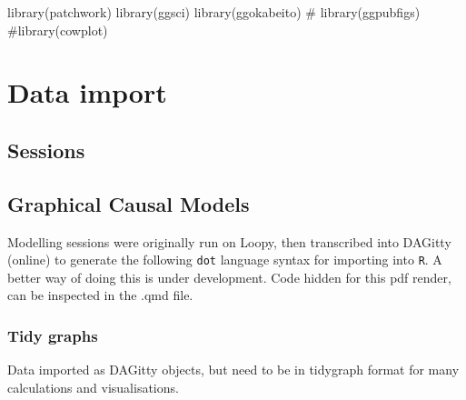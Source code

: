\documentclass[
  letterpaper,
  DIV=11,
  numbers=noendperiod]{scrartcl}
\newenvironment{Shaded}{\begin{snugshade}}{\end{snugshade}}
\newcommand{\CommentTok}[1]{\textcolor[rgb]{0.37,0.37,0.37}{#1}}
\newcommand{\FunctionTok}[1]{\textcolor[rgb]{0.28,0.35,0.67}{#1}}
\newcommand{\NormalTok}[1]{\textcolor[rgb]{0.00,0.23,0.31}{#1}}
\begin{document}
\begin{Shaded}
\begin{Highlighting}[]
\FunctionTok{library}\NormalTok{(patchwork)}
\FunctionTok{library}\NormalTok{(ggsci)}
\FunctionTok{library}\NormalTok{(ggokabeito)}
\CommentTok{\# library(ggpubfigs)}
\CommentTok{\#library(cowplot)}
\end{Highlighting}
\end{Shaded}

\section{Data import}\label{data-import}

\subsection{Sessions}\label{sessions}

\subsection{Graphical Causal Models}\label{graphical-causal-models}

Modelling sessions were originally run on Loopy, then transcribed into
DAGitty (online) to generate the following \texttt{dot} language syntax
for importing into \texttt{R}. A better way of doing this is under
development. Code hidden for this pdf render, can be inspected in the
.qmd file.

\subsubsection{Tidy graphs}\label{tidy-graphs}

Data imported as DAGitty objects, but need to be in tidygraph format for
many calculations and visualisations.
\end{document}

